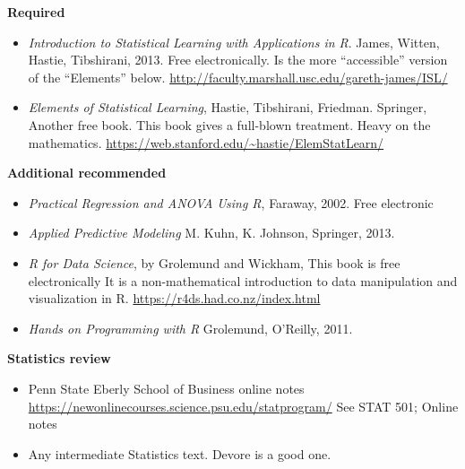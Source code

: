 {\bf Required}
\begin{itemize}
\item {\it Introduction to Statistical Learning with Applications in R}.  James, Witten, Hastie, Tibshirani, 2013. Free electronically. Is the more ``accessible” version of the “Elements” below. \url{http://faculty.marshall.usc.edu/gareth-james/ISL/}
\item {\it Elements of Statistical Learning}, Hastie, Tibshirani, Friedman. Springer,  Another free book. This book gives a full-blown treatment. Heavy on the mathematics. \url{https://web.stanford.edu/~hastie/ElemStatLearn/}
\end{itemize}

{\bf Additional recommended}
\begin{itemize}
\item {\it Practical Regression and ANOVA Using R}, Faraway, 2002. Free electronic
\item{\it Applied Predictive Modeling} M. Kuhn, K. Johnson, Springer, 2013.
\item {\it R for Data Science}, by Grolemund and Wickham, This book is free electronically  It is a non-mathematical introduction to data manipulation and visualization in R. \url{https://r4ds.had.co.nz/index.html}
\item {\it Hands on Programming with R} Grolemund, O'Reilly, 2011. 
\end{itemize}

{\bf Statistics review}
\begin{itemize}
\item Penn State Eberly School of Business online notes \url{https://newonlinecourses.science.psu.edu/statprogram/} See STAT 501; Online notes
\item Any intermediate Statistics text. Devore is a good one.
\end{itemize}










 

